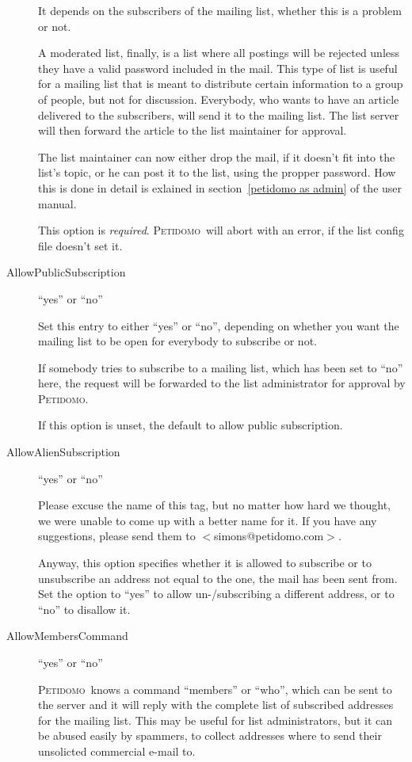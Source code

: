 \documentclass[a4paper]{report}
\newcommand{\Petidomo}{{\scshape Peti\-domo}}
\begin{document}
\begin{description}
It depends on the subscribers of the mailing list, whether this is a
problem or not.

A moderated list, finally, is a list where all postings will be
rejected unless they have a valid password included in the mail. This
type of list is useful for a mailing list that is meant to distribute
certain information to a group of people, but not for discussion.
Everybody, who wants to have an article delivered to the subscribers,
will send it to the mailing list. The list server will then forward
the article to the list maintainer for approval.

The list maintainer can now either drop the mail, if it doesn't fit
into the list's topic, or he can post it to the list, using the
propper password. How this is done in detail is exlained in
section~\ref{petidomo as admin} of the user manual.

This option is \emph{required}. \Petidomo\ will abort with an error,
if the list config file doesn't set it.

\item[AllowPublicSubscription] \hfill ``yes'' or ``no''

Set this entry to either ``yes'' or ``no'', depending on whether you
want the mailing list to be open for everybody to subscribe or not.

If somebody tries to subscribe to a mailing list, which has been set
to ``no'' here, the request will be forwarded to the list
administrator for approval by \Petidomo.

If this option is unset, the default to allow public subscription.

\item[AllowAlienSubscription] \hfill ``yes'' or ``no''

Please excuse the name of this tag, but no matter how hard we thought,
we were unable to come up with a better name for it. If you have any
suggestions, please send them to $<$simons@petidomo.com$>$.

Anyway, this option specifies whether it is allowed to subscribe or to
unsubscribe an address not equal to the one, the mail has been sent
from. Set the option to ``yes'' to allow un-/subscribing a different
address, or to ``no'' to disallow it.

\item[AllowMembersCommand] \hfill ``yes'' or ``no''

\Petidomo\ knows a command ``members'' or ``who'', which can be sent
to the server and it will reply with the complete list of subscribed
addresses for the mailing list. This may be useful for list
administrators, but it can be abused easily by spammers, to collect
addresses where to send their unsolicted commercial e-mail to.


\end{description}
\end{document}
